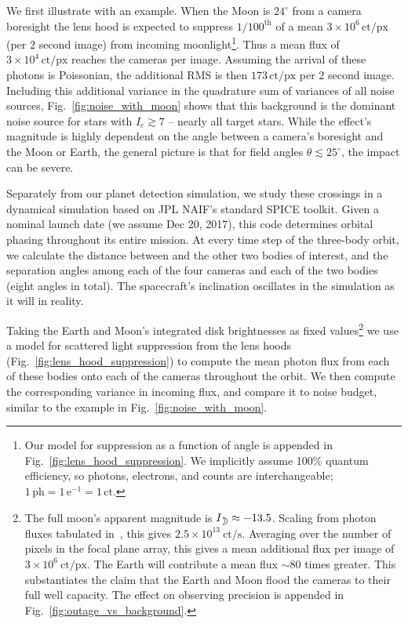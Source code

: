 We first illustrate with an example.
When the Moon is $24^\circ$ from a camera boresight the lens hood 
is expected to suppress $1/100^\mathrm{th}$ of a mean 
$3\times10^6\,\mathrm{ct/px}$ (per 2 second image) from incoming 
moonlight\footnote{Our model for suppression as a function of angle is 
appended in Fig.~\ref{fig:lens_hood_suppression}. We implicitly assume 100\% 
quantum efficiency, so photons, electrons, and counts are interchangeable; 
$1\,\mathrm{ph} = 1\,\mathrm{e^{-1}} = 1\,\mathrm{ct}$.}.
Thus a mean flux of $3\times10^4\,\mathrm{ct/px}$ reaches the cameras per 
image. 
Assuming the arrival of these photons is Poissonian, the additional RMS is 
then $173\,\mathrm{ct/px}$ per 2 second image.
Including this additional variance in the quadrature sum of variances of all 
noise sources, Fig.~\ref{fig:noise_with_moon} shows that this background 
is the dominant noise source for stars with $I_c \gtrsim 7$ -- nearly all 
target stars.
While the effect's magnitude is highly dependent on the angle between a 
camera's
boresight and the Moon or Earth, the general picture is that for field angles 
$\theta \lesssim25^{\circ}$, the impact can be severe.

Separately from our planet detection simulation, we study these 
crossings in a dynamical simulation based on JPL NAIF's standard SPICE toolkit.
Given a nominal launch date (we assume Dec 20, 2017), this code determines 
\tesss orbital phasing throughout its entire mission. 
At every time step of the three-body orbit, we calculate the distance between 
\tess and the other two bodies of interest, and the separation angles among 
each of the four cameras and each of the two bodies (eight angles in total). 
The spacecraft's inclination oscillates in the simulation as it will in 
reality.

Taking the Earth and Moon's integrated disk brightnesses as fixed 
values\footnote{The full moon's apparent magnitude is $I_\moon \approx -13.5$. 
Scaling from photon fluxes tabulated in~\citet{winn_photonflux_2013}, this 
gives $2.5\times10^{13}\ \mathrm{ct/s}$. Averaging over the number of pixels 
in the focal plane array, 
this gives a mean additional flux per image of $3\times10^6\ \mathrm{ct/px}$.
The Earth will contribute a mean flux $\sim {80}$ times greater.
This substantiates the claim that the Earth and Moon flood the cameras to 
their full well capacity. 
The effect on observing precision is appended in 
Fig.~\ref{fig:outage_vs_background}.} we use a model for scattered light 
suppression from 
the \tess lens hoods (Fig.~\ref{fig:lens_hood_suppression}) to compute the 
mean photon flux from each of these bodies onto each of the cameras throughout 
the orbit. We then compute the corresponding variance in incoming flux, and 
compare it to \tesss noise budget, similar to the example in 
Fig.~\ref{fig:noise_with_moon}.

